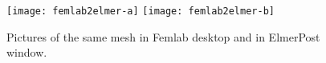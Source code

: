 
%
%

\begin{figure}
\begin{center}
\texttt{[image: femlab2elmer-a]}
\hspace{10mm}
\texttt{[image: femlab2elmer-b]}
\end{center}
\caption{Pictures of the same mesh in Femlab desktop and in ElmerPost window.}
\end{figure}


